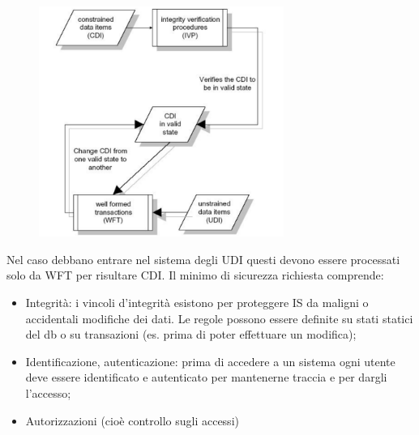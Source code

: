 \begin{figure}[H]
      \centering
      \includegraphics[width=8cm, keepaspectratio]{capitoli/policy/imgs/clark_wilson4.png}
\end{figure}

Nel caso debbano entrare nel sistema degli UDI questi devono essere processati
solo da WFT per
risultare CDI.
Il minimo di sicurezza richiesta comprende:
\begin{itemize}
      \item Integrità: i vincoli d'integrità esistono per proteggere IS da
            maligni o accidentali modifiche
            dei dati. Le regole possono essere definite su stati statici del db
            o su transazioni (es. prima
            di poter effettuare un modifica);
      \item Identificazione, autenticazione: prima di accedere a un sistema ogni
            utente deve essere
            identificato e autenticato per mantenerne traccia e per dargli
            l'accesso;
      \item Autorizzazioni (cioè controllo sugli accessi)
\end{itemize}

